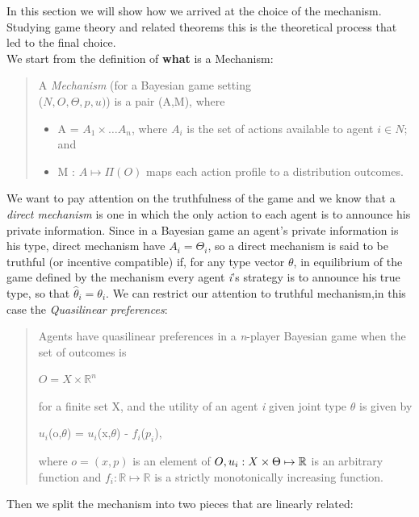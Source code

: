 \documentclass{article}
\begin{document}
\Large{
In this section we will show how we arrived at the choice of the mechanism. Studying game theory and related theorems this is the theoretical process that led to the final choice.\\
We start from the definition of \textbf{what} is a Mechanism:
\begin{quote}
    A \textit{Mechanism} (for a Bayesian game setting\\ ($N,O,\Theta,p,u)$) is a pair (A,M), where
    \begin{itemize}
        \item A = $A_1 \times \dots A_n$, where $A_i$ is the set of actions available to agent $i \in N$; and
        \item M : $A \mapsto \Pi(O)$ maps each action profile to a distribution outcomes.
    \end{itemize}
\end{quote}
We want to pay attention on the truthfulness of the game and we know that a \textit{direct mechanism} is one in which the only action to each agent is to announce his private information. Since in a Bayesian game an agent's private information is his type, direct mechanism have $A_i = \Theta_i$, so a direct mechanism is said to be truthful (or incentive compatible) if, for any type vector $\theta$, in equilibrium of the game defined by the mechanism every agent \textit{i}'s strategy is to announce his true type, so that $\hat{\theta}_i = \theta_i$. We can restrict our attention to truthful mechanism,\newpage in this case the \textit{Quasilinear preferences}:
\begin{quote}
    Agents have quasilinear preferences in a \textit{n}-player Bayesian game when the set of outcomes is
    \begin{center}
        $O = X \times \mathbb{R}^n$
    \end{center}
    for a finite set X, and the utility of an agent \textit{i} given joint type $\theta$ is given by
    \begin{center}
        $u_i$(o,$\theta$) = $u_i$(x,$\theta$) - $f_i$($p_i$),
    \end{center}
    where $o = (x,p)$ is an element of $O,\\ u_i : X \times \Theta \mapsto \mathbb{R}$ is an arbitrary function  and $f_i : \mathbb{R} \mapsto \mathbb{R}$ is a strictly monotonically increasing function.
\end{quote}
Then we split the mechanism into two pieces that are linearly related:
\begin{center}

\end{center}}
\end{document}
